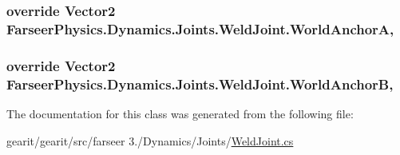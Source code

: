 \hypertarget{class_farseer_physics_1_1_dynamics_1_1_joints_1_1_weld_joint_a2d66bcb8d00e09db224b64fa09644761}{
\subsubsection[{World\+Anchor\+A}]{\setlength{\rightskip}{0pt plus 5cm}override Vector2 Farseer\+Physics.\+Dynamics.\+Joints.\+Weld\+Joint.\+World\+Anchor\+A\hspace{0.3cm}{\ttfamily [get]}, {\ttfamily [set]}}}\label{class_farseer_physics_1_1_dynamics_1_1_joints_1_1_weld_joint_a2d66bcb8d00e09db224b64fa09644761}
\hypertarget{class_farseer_physics_1_1_dynamics_1_1_joints_1_1_weld_joint_abe87f95300c07e6d849bd377a5c2ce16}{
\subsubsection[{World\+Anchor\+B}]{\setlength{\rightskip}{0pt plus 5cm}override Vector2 Farseer\+Physics.\+Dynamics.\+Joints.\+Weld\+Joint.\+World\+Anchor\+B\hspace{0.3cm}{\ttfamily [get]}, {\ttfamily [set]}}}\label{class_farseer_physics_1_1_dynamics_1_1_joints_1_1_weld_joint_abe87f95300c07e6d849bd377a5c2ce16}


The documentation for this class was generated from the following file\+:\begin{DoxyCompactItemize}
\item 
gearit/gearit/src/farseer 3./\+Dynamics/\+Joints/\hyperlink{_weld_joint_8cs}{Weld\+Joint.\+cs}\end{DoxyCompactItemize}
